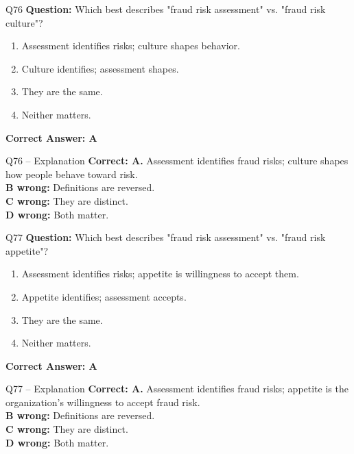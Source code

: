 \documentclass[aspectratio=169,10pt]{beamer}
\begin{document}
	\begin{frame}[t]{Q76}
		\small
		\textbf{Question:} Which best describes "fraud risk assessment" vs. "fraud risk culture"?
		\begin{enumerate}[label=\Alph*.,itemsep=1pt,topsep=2pt]
			\item Assessment identifies risks; culture shapes behavior.
			\item Culture identifies; assessment shapes.
			\item They are the same.
			\item Neither matters.
		\end{enumerate}
		\vspace{4pt}
		\textbf{Correct Answer: A}
	\end{frame}
	
	\begin{frame}[t]{Q76 -- Explanation}
		\small
		\textbf{Correct: A.} Assessment identifies fraud risks; culture shapes how people behave toward risk. \\[4pt]
		\textbf{B wrong:} Definitions are reversed. \\[2pt]
		\textbf{C wrong:} They are distinct. \\[2pt]
		\textbf{D wrong:} Both matter.
	\end{frame}
	
	\begin{frame}[t]{Q77}
		\small
		\textbf{Question:} Which best describes "fraud risk assessment" vs. "fraud risk appetite"?
		\begin{enumerate}[label=\Alph*.,itemsep=1pt,topsep=2pt]
			\item Assessment identifies risks; appetite is willingness to accept them.
			\item Appetite identifies; assessment accepts.
			\item They are the same.
			\item Neither matters.
		\end{enumerate}
		\vspace{4pt}
		\textbf{Correct Answer: A}
	\end{frame}
	
	\begin{frame}[t]{Q77 -- Explanation}
		\small
		\textbf{Correct: A.} Assessment identifies fraud risks; appetite is the organization's willingness to accept fraud risk. \\[4pt]
		\textbf{B wrong:} Definitions are reversed. \\[2pt]
		\textbf{C wrong:} They are distinct. \\[2pt]
		\textbf{D wrong:} Both matter.
	\end{frame}
	
\end{document}
